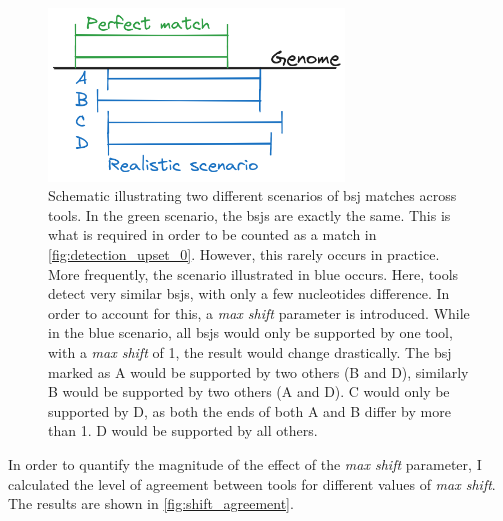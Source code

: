 \begin{figure}[ht] \centering

    \includegraphics[width=0.7\textwidth]{chapters/4_results_and_discussion/figures/grouping.png}
    \caption{Schematic illustrating two different scenarios of \gls{bsj}
        matches
        across tools.
        In the green scenario, the \gls{bsj}s are exactly the same.
        This is what is required in order to be counted as a match in
        \cref{fig:detection_upset_0}.
        However, this rarely occurs in practice.
        More frequently, the scenario illustrated in blue occurs.
        Here, tools detect very similar \gls{bsj}s, with only a few nucleotides
        difference.
        In order to account for this, a \textit{max shift} parameter is introduced.
        While in the blue scenario, all \gls{bsj}s would only be supported by one tool,
        with a \textit{max shift} of 1, the result would change drastically.
        The \gls{bsj} marked as A would be supported by two others (B and D), similarly
        B would be supported by two others (A and D).
        C would only be supported by D, as both the ends of both A and B differ by more
        than 1.
        D would be supported by all others.
    }
    \label{fig:detection_shift_schematic}
\end{figure}

In order to quantify the magnitude of the effect of the \textit{max shift}
parameter, I calculated the level of agreement between tools for different
values of \textit{max shift}.
The results are shown in \cref{fig:shift_agreement}.

